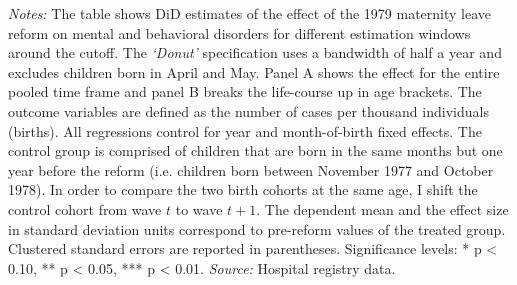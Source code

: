 \begin{landscape}
\begin{table}[H]
\begin{threeparttable}
 		\begin{tablenotes} 
 			\item \scriptsize \emph{Notes:} The table shows DiD estimates of the effect of the 1979 maternity leave reform on mental and behavioral disorders for different estimation windows around the cutoff. The \textit{`Donut'} specification uses a bandwidth of half a year and excludes children born in April and May. Panel A shows the effect for the entire pooled time frame and panel B breaks the life-course up in age brackets. The outcome variables are defined as the number of cases per thousand individuals (births). All regressions control for year and month-of-birth fixed effects. The control group is comprised of children that are born in the same months but one year before the reform (i.e. children born between November 1977 and October 1978). In order to compare the two birth cohorts at the same age, I shift the control cohort from wave $t$ to wave $t+1$. The dependent mean and the effect size in standard deviation units correspond to pre-reform values of the treated group. Clustered standard errors are reported in parentheses. \newline Significance levels: * p < 0.10, ** p < 0.05, *** p < 0.01. \newline 	\emph{Source:} Hospital registry data.
 		\end{tablenotes} 
 	\end{threeparttable} 
 \end{table}
\vspace*{\fill}\clearpage 
\end{landscape}
